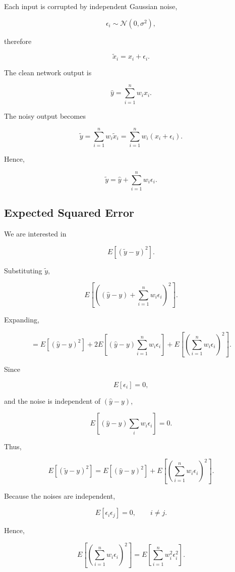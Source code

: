 \documentclass[11pt]{article}
\begin{document}
	Each input is corrupted by independent Gaussian noise,
	
	\[
	\epsilon_i \sim \mathcal{N}(0,\sigma^2),
	\]
	
	therefore
	
	\[
	\tilde{x}_i=x_i+\epsilon_i.
	\]
	
	The clean network output is
	
	\[
	\hat{y}=\sum_{i=1}^{n}w_ix_i.
	\]
	
	The noisy output becomes
	
	\[
	\tilde{y}
	=
	\sum_{i=1}^{n}w_i\tilde{x}_i
	=
	\sum_{i=1}^{n}w_i(x_i+\epsilon_i).
	\]
	
	Hence,
	
	\[
	\tilde{y}
	=
	\hat{y}
	+
	\sum_{i=1}^{n}w_i\epsilon_i.
	\]
	
	\subsection*{Expected Squared Error}
	
	We are interested in
	
	\[
	E[(\tilde{y}-y)^2].
	\]
	
	Substituting $\tilde{y}$,
	
	\[
	E\left[
	\left(
	(\hat{y}-y)
	+
	\sum_{i=1}^{n}w_i\epsilon_i
	\right)^2
	\right].
	\]
	
	Expanding,
	
	\[
	=
	E[(\hat{y}-y)^2]
	+
	2E\left[
	(\hat{y}-y)
	\sum_{i=1}^{n}w_i\epsilon_i
	\right]
	+
	E\left[
	\left(
	\sum_{i=1}^{n}w_i\epsilon_i
	\right)^2
	\right].
	\]
	
	Since
	
	\[
	E[\epsilon_i]=0,
	\]
	
	and the noise is independent of $(\hat{y}-y)$,
	
	\[
	E\left[
	(\hat{y}-y)
	\sum_i w_i\epsilon_i
	\right]
	=0.
	\]
	
	Thus,
	
	\[
	E[(\tilde{y}-y)^2]
	=
	E[(\hat{y}-y)^2]
	+
	E\left[
	\left(
	\sum_{i=1}^{n}w_i\epsilon_i
	\right)^2
	\right].
	\]
	
	Because the noises are independent,
	
	\[
	E[\epsilon_i\epsilon_j]=0,
	\qquad i\neq j.
	\]
	
	Hence,
	
	\[
	E\left[
	\left(
	\sum_{i=1}^{n}w_i\epsilon_i
	\right)^2
	\right]
	=
	E\left[
	\sum_{i=1}^{n}w_i^2\epsilon_i^2
	\right].
	\]
	
\end{document}
